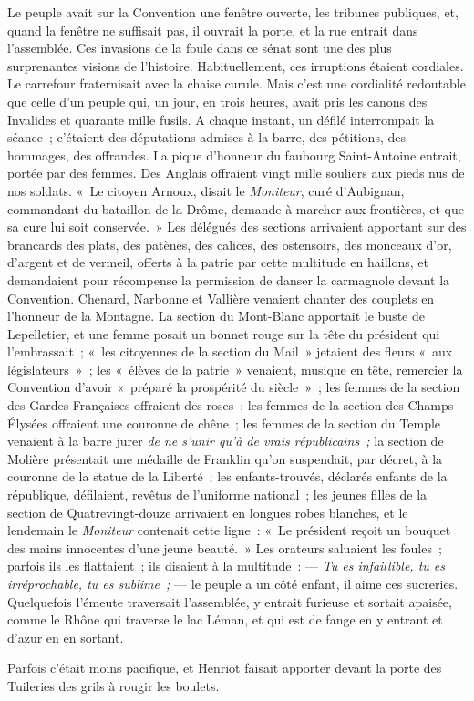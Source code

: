 \documentclass[french,twoside]{book} %
\begin{document}
\noindent Le peuple avait sur la Convention une fenêtre ouverte, les tribunes publiques, et, quand la fenêtre ne suffisait pas, il ouvrait la porte, et la rue entrait dans l’assemblée. Ces invasions de la foule dans ce sénat sont une des plus surprenantes visions de l’histoire. Habituellement, ces irruptions étaient cordiales. Le carrefour fraternisait avec la chaise curule. Mais c’est une cordialité redoutable que celle d’un peuple qui, un jour, en trois heures, avait pris les canons des Invalides et quarante mille fusils. A chaque instant, un défilé interrompait la séance ; c’étaient des députations admises à la barre, des pétitions, des hommages, des offrandes. La pique d’honneur du faubourg Saint-Antoine entrait, portée par des femmes. Des Anglais offraient vingt mille souliers aux pieds nus de nos soldats. « Le citoyen Arnoux, disait le \emph{Moniteur}, curé d’Aubignan, commandant du bataillon de la Drôme, demande à marcher aux frontières, et que sa cure lui soit conservée. » Les délégués des sections arrivaient apportant sur des brancards des plats, des patènes, des calices, des  ostensoirs, des monceaux d’or, d’argent et de vermeil, offerts à la patrie par cette multitude en haillons, et demandaient pour récompense la permission de danser la carmagnole devant la Convention. Chenard, Narbonne et Vallière venaient chanter des couplets en l’honneur de la Montagne. La section du Mont-Blanc apportait le buste de Lepelletier, et une femme posait un bonnet rouge sur la tête du président qui l’embrassait ; « les citoyennes de la section du Mail » jetaient des fleurs « aux législateurs » ; les « élèves de la patrie » venaient, musique en tête, remercier la Convention d’avoir « préparé la prospérité du siècle » ; les femmes de la section des Gardes-Françaises offraient des roses ; les femmes de la section des Champs-Élysées offraient une couronne de chêne ; les femmes de la section du Temple venaient à la barre jurer \emph{de ne s’unir qu’à de vrais républicains ;} la section de Molière présentait une médaille de Franklin qu’on suspendait, par décret, à la couronne de la statue de la Liberté ; les enfants-trouvés, déclarés enfants de la république, défilaient, revêtus de l’uniforme national ; les jeunes filles de la section de Quatrevingt-douze arrivaient en longues robes blanches, et le lendemain le \emph{Moniteur} contenait cette ligne : « Le président reçoit un bouquet des mains innocentes d’une jeune beauté. » Les orateurs saluaient les foules ; parfois ils les flattaient ; ils disaient à la multitude : — \emph{Tu es infaillible, tu es irréprochable, tu es sublime ;} — le peuple a un côté enfant, il aime ces sucreries. Quelquefois l’émeute traversait  l’assemblée, y entrait furieuse et sortait apaisée, comme le Rhône qui traverse le lac Léman, et qui est de fange en y entrant et d’azur en en sortant.\par
Parfois c’était moins pacifique, et Henriot faisait apporter devant la porte des Tuileries des grils à rougir les boulets.\par
\end{document}
